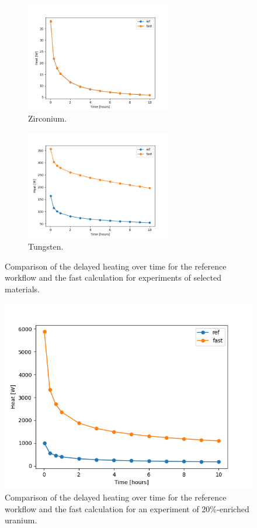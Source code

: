 \begin{figure}[htbp!] %
  \centering
  \begin{subfigure}[b]{0.49\textwidth}
    \centering
    \includegraphics[width=0.7\textwidth]{figures/fast-40_overtime}
    \caption{Zirconium.}
  \end{subfigure}
  \hfill
  \begin{subfigure}[b]{0.49\textwidth}
    \centering
    \includegraphics[width=0.7\textwidth]{figures/fast-74_overtime}
    \caption{Tungsten.}
  \end{subfigure}
  \hfill
  \caption{Comparison of the delayed heating over time for the reference workflow and the fast calculation for experiments of selected materials.}
  \label{fig:time-2}
\end{figure}

\begin{figure}[htbp!]
  \begin{center}
    \includegraphics[width=0.42\linewidth]{figures/fast-92_4_4_overtime}
  \end{center}
  \caption{Comparison of the delayed heating over time for the reference workflow and the fast calculation for an experiment of 20\%-enriched uranium.}
  \label{fig:time-3}
\end{figure}

